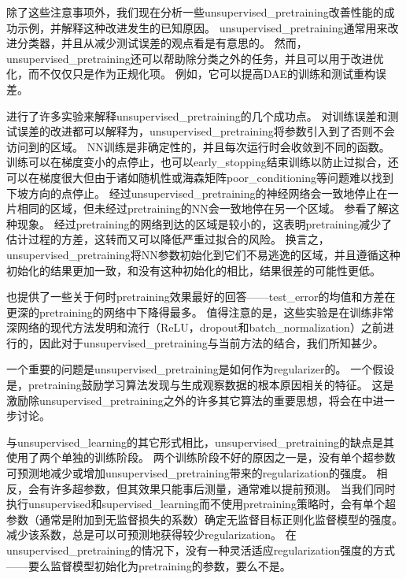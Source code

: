 除了这些注意事项外，我们现在分析一些\gls{unsupervised_pretraining}改善性能的成功示例，并解释这种改进发生的已知原因。
\gls{unsupervised_pretraining}通常用来改进分类器，并且从减少测试误差的观点看是有意思的。
然而，\gls{unsupervised_pretraining}还可以帮助除分类之外的任务，并且可以用于改进优化，而不仅仅只是作为正规化项。
例如，它可以提高\gls{DAE}的训练和测试重构误差\citep{Hinton-Science2006}。


\cite{Erhan+al-2010-small}进行了许多实验来解释\gls{unsupervised_pretraining}的几个成功点。
对训练误差和测试误差的改进都可以解释为，\gls{unsupervised_pretraining}将参数引入到了否则不会访问到的区域。
\gls{NN}训练是非确定性的，并且每次运行时会收敛到不同的函数。
训练可以在梯度变小的点停止，也可以\gls{early_stopping}结束训练以防止过拟合，还可以在梯度很大但由于诸如随机性或海森矩阵\gls{poor_conditioning}等问题难以找到下坡方向的点停止。
经过\gls{unsupervised_pretraining}的神经网络会一致地停止在一片相同的区域，但未经过\gls{pretraining}的\gls{NN}会一致地停在另一个区域。
参看了解这种现象。
经过\gls{pretraining}的网络到达的区域是较小的，这表明\gls{pretraining}减少了估计过程的方差，这转而又可以降低严重过拟合的风险。
换言之，\gls{unsupervised_pretraining}将\gls{NN}参数初始化到它们不易逃逸的区域，并且遵循这种初始化的结果更加一致，和没有这种初始化的相比，结果很差的可能性更低。


\cite{Erhan+al-2010-small}也提供了一些关于何时\gls{pretraining}效果最好的回答——\gls{test_error}的均值和方差在更深的\gls{pretraining}的网络中下降得最多。
值得注意的是，这些实验是在训练非常深网络的现代方法发明和流行（\gls{ReLU}，\gls{dropout}和\gls{batch_normalization}）之前进行的，因此对于\gls{unsupervised_pretraining}与当前方法的结合，我们所知甚少。


一个重要的问题是\gls{unsupervised_pretraining}是如何作为\gls{regularizer}的。
一个假设是，\gls{pretraining}鼓励学习算法发现与生成观察数据的根本原因相关的特征。
这是激励除\gls{unsupervised_pretraining}之外的许多其它算法的重要思想，将会在中进一步讨论。


与\gls{unsupervised_learning}的其它形式相比，\gls{unsupervised_pretraining}的缺点是其使用了两个单独的训练阶段。
两个训练阶段不好的原因之一是，没有单个超参数可预测地减少或增加\gls{unsupervised_pretraining}带来的\gls{regularization}的强度。
相反，会有许多超参数，但其效果只能事后测量，通常难以提前预测。
当我们同时执行\gls{unsupervised}和\gls{supervised_learning}而不使用\gls{pretraining}策略时，会有单个超参数（通常是附加到无监督损失的系数）确定无监督目标正则化监督模型的强度。
减少该系数，总是可以可预测地获得较少\gls{regularization}。
在\gls{unsupervised_pretraining}的情况下，没有一种灵活适应\gls{regularization}强度的方式——要么监督模型初始化为\gls{pretraining}的参数，要么不是。

